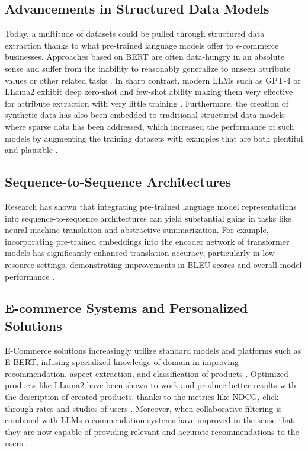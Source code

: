 \subsection{Advancements in Structured Data Models}
Today, a multitude of datasets could be pulled through structured data extraction thanks to what pre-trained language models offer to e-commerce businesses. Approaches based on BERT are often data-hungry in an absolute sense and suffer from the inability to reasonably generalize to unseen attribute values or other related tasks \citep{brinkmann2024product}. In sharp contrast, modern LLMs such as GPT-4 or LLama2 exhibit deep zero-shot and few-shot ability making them very effective for attribute extraction with very little training \citep{brinkmann2024product}. Furthermore, the creation of synthetic data has also been embedded to traditional structured data models where sparse data has been addressed, which increased the performance of such models by augmenting the training datasets with examples that are both plentiful and plausible \citep{skondras2023generating}.

\subsection{Sequence-to-Sequence Architectures}
Research has shown that integrating pre-trained language model representations into sequence-to-sequence architectures can yield substantial gains in tasks like neural machine translation and abstractive summarization. For example, incorporating pre-trained embeddings into the encoder network of transformer models has significantly enhanced translation accuracy, particularly in low-resource settings, demonstrating improvements in BLEU scores and overall model performance \citep{edunov-etal-2019-pre}.

\subsection{E-commerce Systems and Personalized Solutions}
E-Commerce solutions increasingly utilize standard models and platforms such as E-BERT, infusing specialized knowledge of domain in improving recommendation, aspect extraction, and classification of products \citep{zhang2021ebert}. Optimized products like LLama2 have been shown to work and produce better results with the description of created products, thanks to the metrics like NDCG, click-through rates and studies of users \citep{zhou2023leveraging}. Moreover, when collaborative filtering is combined with LLMs recommendation systems have improved in the sense that they are now capable of providing relevant and accurate recommendations to the users \citep{xu2024emerging}.

